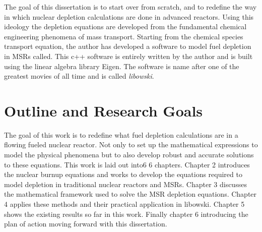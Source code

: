 The goal of this dissertation is to start over from scratch, and to redefine the way in which nuclear depletion calculations are done in advanced reactors. Using this ideology the depletion equations are developed from the fundamental chemical engineering phenomena of mass transport. Starting from the chemical species transport equation, the author has developed a software to model fuel depletion in MSRs called. This c++ software is entirely written by the author and is built using the linear algebra library Eigen. The software is name after one of the greatest movies of all time and is called \textit{libowski}.

\section{Outline and Research Goals}

The goal of this work is to redefine what fuel depletion calculations are in a flowing fueled nuclear reactor. Not only to set up the mathematical expressions to model the physical phenomena but to also develop robust and accurate solutions to these equations. This work is laid out into6 6 chapters. Chapter 2 introduces the nuclear burnup equations and works to develop the equations required to model depletion in traditional nuclear reactors and MSRs. Chapter 3 discusses the mathematical framework used to solve the MSR depletion equations. Chapter 4 applies these methods  and their practical application in libowski. Chapter 5 shows the existing results so far in this work. Finally chapter 6 introducing the plan of action moving forward with this dissertation. 
